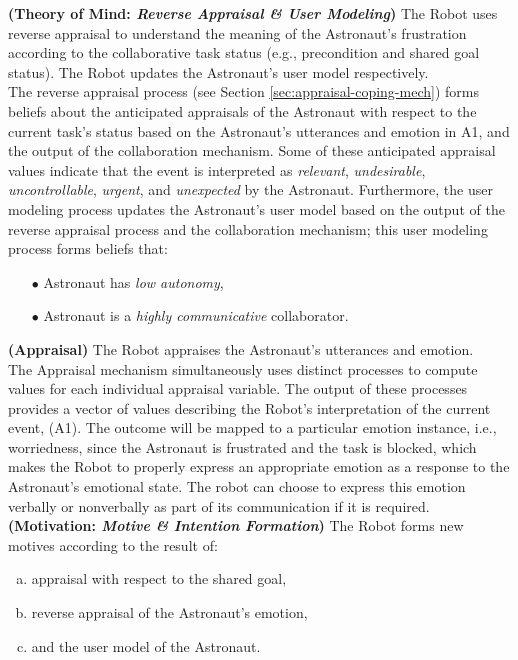 \noindent \textbf{(Theory of Mind: \textit{Reverse Appraisal \& User
Modeling})} The Robot uses reverse appraisal to understand the meaning of the
Astronaut's frustration according to the collaborative task status (e.g.,
precondition and shared goal status). The Robot updates the Astronaut's user
model respectively.\\

The reverse appraisal process (see Section \ref{sec:appraisal-coping-mech})
forms beliefs about the anticipated appraisals of the Astronaut with respect to
the current task's status based on the Astronaut's utterances and emotion in A1,
and the output of the collaboration mechanism. Some of these anticipated
appraisal values indicate that the event is interpreted as \textit{relevant},
\textit{undesirable}, \textit{uncontrollable}, \textit{urgent}, and
\textit{unexpected} by the Astronaut. Furthermore, the user modeling process
updates the Astronaut's user model based on the output of the reverse appraisal
process and the collaboration mechanism; this user modeling process forms
beliefs that:

\begin{itemize}
  \item[$\bullet$] Astronaut has \textit{low autonomy},
  \item[$\bullet$] Astronaut is a \textit{highly communicative} collaborator.
\end{itemize}

\noindent \textbf{(Appraisal)} The Robot appraises the Astronaut's utterances
and emotion.\\

The Appraisal mechanism simultaneously uses distinct processes to compute values
for each individual appraisal variable. The output of these processes provides a
vector of values describing the Robot's interpretation of the current event,
(A1). The outcome will be mapped to a particular emotion instance, i.e.,
worriedness, since the Astronaut is frustrated and the task is blocked, which
makes the Robot to properly express an appropriate emotion as a response to the
Astronaut's emotional state. The robot can choose to express this emotion
verbally or nonverbally as part of its communication if it is required.\\

\noindent \textbf{(Motivation: \textit{Motive \& Intention Formation})}
The Robot forms new motives according to the result of:

\begin{enumerate}[a)]
  \item appraisal with respect to the shared goal,
  \item reverse appraisal of the Astronaut's emotion,
  \item and the user model of the Astronaut. 
\end{enumerate}

